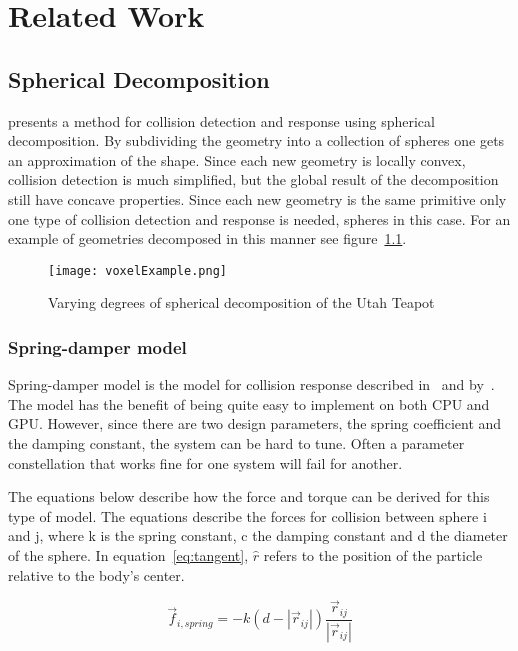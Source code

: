 \chapter{Related Work}\label{cha:related}

\section{Spherical Decomposition}\label{sec:decomp}
\cite{gpugems} presents a method for collision detection and response using spherical
decomposition. By subdividing the geometry into a collection of spheres one gets an
approximation of the shape. Since each new geometry is locally convex, collision
detection is much simplified, but the global result of the decomposition still have
concave properties. Since each new geometry is the same primitive only
one type of collision detection and response is needed, spheres in this case.
For an example of geometries
decomposed in this manner see figure~\ref{fig:bunnies}.

\begin{figure}[H]
  \centering
  \texttt{[image: voxelExample.png]}
  \caption{Varying degrees of spherical decomposition of the Utah Teapot}
  \label{fig:bunnies}
\end{figure}

\subsection{Spring-damper model}
Spring-damper model is the model for collision response described in~\cite{gpugems} and by~\cite{fossum}.
The model has the benefit of being quite easy to implement on both CPU and GPU.
However, since there are two design parameters, the spring coefficient and the damping
constant, the system can be hard to tune. Often a parameter constellation that works
fine for one system will fail for another.

The equations below describe how the force and torque can be derived for this type
of model. The equations describe the forces for collision between sphere i and j,
where k is the spring constant, c the damping constant and d the
diameter of the sphere. In equation~\ref{eq:tangent}, $\hat{r}$ refers to the
position of the particle relative to the body's center.

\begin{equation}
  \vec{f}_{i,spring} = -k(d-|\vec{r}_{ij}|)\frac{\vec{r}_{ij}}{|\vec{r}_{ij}|}
\end{equation}

